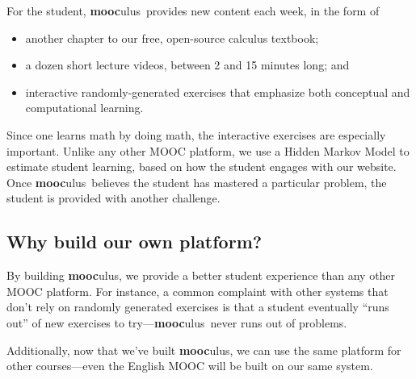 \documentclass[12pt]{amsart}
\newcommand{\mooculus}{\textsf{\textbf{mooc}ulus}}
\begin{document}
For the student, \mooculus\ provides new content each week, in the form of
\begin{itemize}
\item another chapter to our free, open-source calculus textbook;
\item a dozen short lecture videos, between 2 and 15 minutes long; and
\item interactive randomly-generated exercises that emphasize both conceptual and computational learning.
\end{itemize}
Since one learns math by doing math, the interactive exercises are
especially important.  Unlike any other MOOC platform, we use
a Hidden Markov Model to estimate student learning, based on how the
student engages with our website.  Once \mooculus\ believes the
student has mastered a particular problem, the
student is provided with another challenge.

\subsection*{Why build our own platform?}

By building \mooculus, we provide a better student experience than any
other MOOC platform.  For instance, a common complaint with other
systems that don't rely on randomly generated exercises is that a
student eventually ``runs out'' of new exercises to try---\mooculus\
never runs out of problems.

Additionally, now that we've built \mooculus, we can use the same
platform for other courses---even the English MOOC will be built on
our same system.
\end{document}
